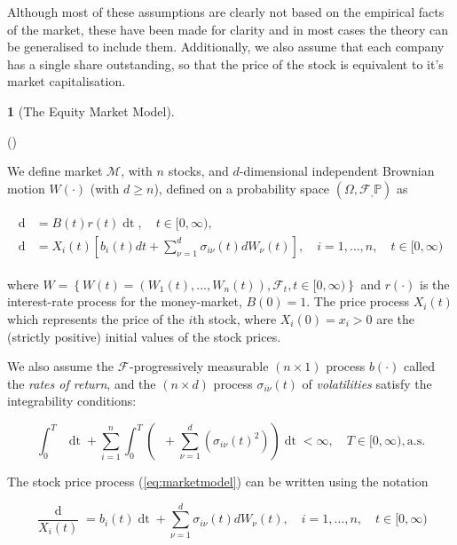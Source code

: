 \documentclass[british]{amsart}
\numberwithin{equation}{section}
\numberwithin{figure}{section}
\theoremstyle{plain}
\theoremstyle{definition}
\newtheorem{defn}[thm]{\protect\definitionname}
\theoremstyle{plain}
\theoremstyle{plain}
\theoremstyle{plain}
\theoremstyle{remark}
\theoremstyle{plain}
\providecommand{\definitionname}{Definition}
\renewcommand{\d}[1]{\mathop{\mathrm{d}{#1}}}
\newcommand{\ranget}{t\in[0,\infty)}
\newcommand{\filtration}[1]{\mathcal{F}_{#1}}
\newcommand{\almostsurely}{\text{a.s.}}
\newcommand{\abs}[1]{\mathop{|{#1}|}}
\newcommand{\market}{\mathcal{M}}
\newcommand{\rangei}{i=1,\dots,n}
\newcommand{\measure}{\mathbb{P}}
\newcommand{\probabilityspace}{(\Omega,\filtration,\measure)}
\begin{document}
Although most of these assumptions are clearly not based on the empirical facts of the market, these have been made for clarity and in most cases the theory can be generalised to include them. Additionally, we also assume that each company has a single share outstanding, so that the price of the stock is equivalent to it's market capitalisation.

\begin{defn} [The Equity Market Model]
	\label{def:marketmodel}

 	(\cite{fernholz2009})

	We define market $\market$, with $n$ stocks, and $d$-dimensional independent Brownian 
	motion $W(\cdot)$ (with $d \ge n$), defined on a probability space 
	$\probabilityspace$ as

	\begin{gather}
		\label{eq:marketmodel}
		\begin{split}
			\d{B(t)} &= B(t)r(t)\d{t},	
				\quad \ranget, \\
			\d{X_{i}(t)} &= X_{i}(t) \left[b_{i}(t)dt + \sum_{\nu=1}^{d} \sigma_{i\nu}(t) dW_{\nu}(t)\right],
				\quad \rangei,
				\quad \ranget
		\end{split}
	\end{gather}

	where $W = \left\{ W(t)=(W_{1}(t),...,W_{n}(t)),\filtration{t},\ranget \right\}$ and $r(\cdot)$ is the interest-rate process for the money-market, $B(0)=1$. The price process $X_{i}(t)$ which represents the price of the $i$th stock, where $X_{i}(0) = x_{i} > 0$ are the (strictly positive) initial values of the stock prices.

	We also assume the $\filtration{}$-progressively measurable $(n \times 1)$ process $b(\cdot)$ called the \textit{rates of return}, and the $(n \times d)$ process $\sigma_{i\nu}(t)$ of \textit{volatilities} satisfy the integrability conditions: 

	\begin{equation*}
		\int_{0}^{T} 
		\abs{r(t)} 
		\d{t} +
		\sum_{i=1}^{n} \int_{0}^{T} 
			\left( 
					\abs{b_{i}(t)} +
					\sum_{\nu=1}^{d} ( \sigma_{i\nu}(t)^2  ) 
					\right) \d{t} < \infty,
		\quad
		T \in [0, \infty),
		\almostsurely
	 \end{equation*}

\end{defn}

The stock price process (\ref{eq:marketmodel}) can be written using the notation 

\begin{equation*}
	\label{eq:stockpriceprocessdiff}
		\frac{\d{X_{i}(t)}}{X_{i}(t)} = 
				b_{i}(t)\d{t} + 
				\sum_{\nu=1}^{d} \sigma_{i\nu}(t) dW_{\nu}(t),
			\quad \rangei,
			\quad \ranget
\end{equation*}
\end{document}
